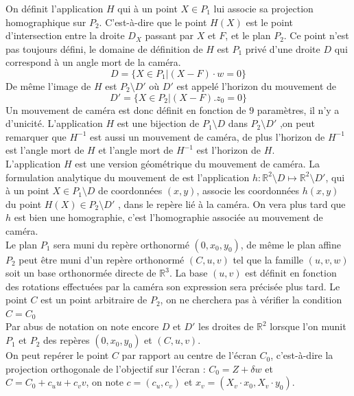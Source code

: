 \begin{defnot}
On définit l'application $H$ qui à un point $X\in P_{1}$ lui associe sa projection homographique sur $P_{2}$. C'est-à-dire que le point $H(X)$ est le point d'intersection entre la droite $D_{X}$ passant par $X$ et $F$, et le plan $P_{2}$. Ce point n'est pas toujours défini, le domaine de définition de $H$ est $P_1$ privé d'une droite $D$ qui correspond à un angle mort de la caméra.
\begin{equation*}
D=\{X\in P_1 | (X-F) \cdot w=0\}
\end{equation*}
De même l'image de $H$ est $P_2 \setminus D'$ où $D'$ est appelé l'horizon du mouvement de \begin{equation*}
D'=\{ X\in P_2 | (X-F).z_0=0\}
\end{equation*}
Un mouvement de caméra est donc définit en fonction de $9$ paramètres, il n'y a d'unicité.
L'application $H$ est une bijection de $P_1 \setminus D$ dans $P_2 \setminus D'$ ,on peut remarquer que $H^{-1}$ est aussi un mouvement de caméra, de plus l'horizon de $H^{-1}$ est l'angle mort de $H$ et l'angle mort de $H^{-1}$ est l'horizon de $H$.\\
L'application $H$ est une version géométrique du mouvement de caméra. La formulation analytique du mouvement de est l'application $h:\mathbb{R}^{2} \setminus D \mapsto\mathbb{R}^{2}\setminus D'$, qui à un point $X\in P_1\setminus D$ de coordonnées $(x,y)$,  associe les coordonnées $h(x,y)$ du point $H(X)\in P_2 \setminus D'$ , dans le repère lié à la caméra.
On vera plus tard que $h$ est bien une homographie, c'est l'homographie associée au mouvement de caméra.\\
Le plan $P_1$ sera muni du repère orthonormé $(0,x_0,y_0)$, de même le plan affine $P_{2}$ peut être muni d'un repère orthonormé $(C,u,v)$ tel que la famille $(u,v,w)$ soit un base orthonormée directe de $\mathbb{R}^{3}$. La base $(u,v)$ est définit en fonction des  rotations effectuées par la caméra son expression sera précisée plus tard. Le point $C$ est un point arbitraire de $P_2$, on ne cherchera pas à vérifier la condition $C=C_0$ \\
Par abus de notation on note encore $D$ et $D'$ les droites de $\mathbb{R}^{2}$ lorsque l'on munit $P_1$ et $P_2$ des repères $(0,x_0,y_0)$ et $(C,u,v)$.  \\
On peut repérer le point $C$ par rapport au centre de l'écran $C_{0}$, c'est-à-dire la projection orthogonale de l'objectif sur l'écran : $C_{0}=Z+\delta w$ et $C=C_{0}+c_{u}u+c_{v}v$, on note $c=(c_u,c_v)$ et $x_v = (X_v \cdot x_0,X_v \cdot y_0)$.\\
\label{defpoint}
\end{defnot}
